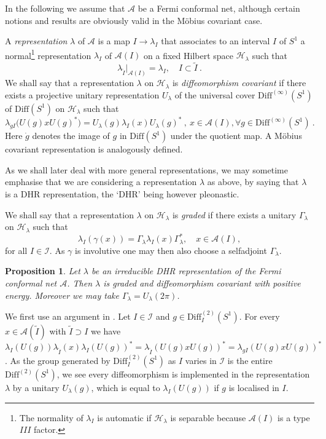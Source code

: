 \documentclass[11pt]{article}
\def\proof{\trivlist \item[\hskip \labelsep{\bf Proof.\ }]}
\def\g{\gamma}
\def\Ga{\Gamma}
\def\l{\lambda}
\newtheorem{proposition}[theorem]{Proposition}
\def\A{{\cal A}}
\def\I{{\cal I}}
\def\H{{\cal H}}
\def\Diff{{\rm Diff}}
\def\Diff{{\mathrm {Diff}}}
\def\A{{\mathcal A}}
\def\H{{\mathcal H}}
\def\I{{\mathcal I}}
\begin{document}
In the following we assume that $\A$ be a Fermi conformal net, although certain notions and results are obviously valid in the M\"obius covariant case.

A \emph{representation} $\l$ of $\A$ is a map $I\to\l_I$ that 
associates to an interval $I$ of $S^1$ a normal\footnote{The normality of $\l_I$ is automatic if $\H_\l$ is separable because $\A(I)$ is a type $III$ factor.}
representation $\l_I$ of $\A(I)$ on a fixed Hilbert space $\H_{\l}$ such that
\begin{equation}
\label{rep}
\l_{\tilde I}|_{\A(I)} = \l_I,\quad I\subset \tilde I\ .
\end{equation}
We shall say that a representation $\l$ on $\H_{\l}$ 
is {\em diffeomorphism covariant} 
if there exists a projective unitary representation $U_\l$ of the universal cover 
$\Diff^{(\infty)}(S^1)$ of $\Diff(S^1)$ on $\H_{\l}$ such that
\[
\l_{\dot{g}I}\big(U(g)xU(g)^*\big) = U_\l(g)\l_I(x)U_\l(g)^*\ ,\  x\in\A(I) , 
\forall g\in \Diff^{(\infty)}(S^1)\ .
\]
Here $\dot g$ denotes the image of $g$ in $\Diff(S^1)$ under the quotient map.
A M\"obius covariant representation is analogously defined.

As we shall later deal with more general representations, we may sometime emphasise that we are considering a representation $\l$ as above, by saying that $\l$ is a DHR representation, the `DHR' being however pleonastic.

We shall say that a representation $\l$ on $\H_{\l}$ is \emph{graded}
if there exists a unitary $\Ga_{\l}$ on $\H_{\l}$ such that
\[
\l_I(\g(x)) = \Ga_{\l}\l_I(x)\Ga^*_{\l},\quad x\in\A(I) ,
\]
for all $I\in\I$. As $\g$ is involutive one may then also choose a selfadjoint $\Ga_\l$.
%
\begin{proposition}\label{DHRgraded}
Let $\l$ be an irreducible DHR representation of the Fermi conformal net $\A$. Then $\l$ is graded and diffeomorphism covariant with positive energy. Moreover we may take $\Ga_\l = U_\l(2\pi)$.
\end{proposition}
\proof
We first use an argument in \cite{KL1}. Let $I\in\I$ and $g\in\Diff_I^{(2)}(S^1)$. For every $x\in\A(\tilde I)$ with $\tilde I\supset I$ we have $\l_I(U(g))\l_{\tilde I}(x)\l_I(U(g))^* = \l_{\tilde I}(U(g)xU(g))^* = \l_{gI}(U(g)xU(g))^*$. As the group generated by $\Diff_I^{(2)}(S^1)$ as $I$ varies in $\I$ is the entire $\Diff^{(2)}(S^1)$, we see every diffeomorphism is implemented in the representation $\l$ by a unitary $U_\l(g)$, which is equal to $\l_I(U(g))$ if $g$ is localised in $I$.
\end{document}
